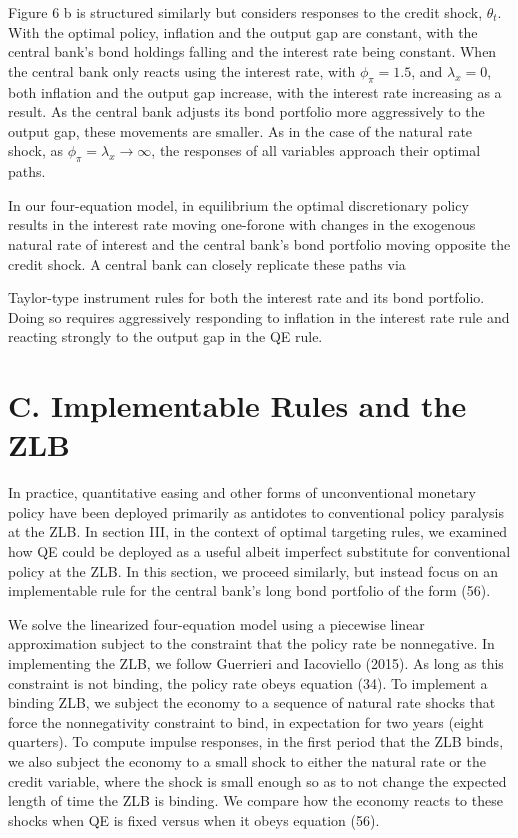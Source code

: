 \documentclass[10pt]{article}
\begin{document}
Figure 6 b is structured similarly but considers responses to the credit shock, $\theta_{t}$. With the optimal policy, inflation and the output gap are constant, with the central bank's bond holdings falling and the interest rate being constant. When the central bank only reacts using the interest rate, with $\phi_{\pi}=1.5$, and $\lambda_{x}=0$, both inflation and the output gap increase, with the interest rate increasing as a result. As the central bank adjusts its bond portfolio more aggressively to the output gap, these movements are smaller. As in the case of the natural rate shock, as $\phi_{\pi}=\lambda_{x} \rightarrow \infty$, the responses of all variables approach their optimal paths.

In our four-equation model, in equilibrium the optimal discretionary policy results in the interest rate moving one-forone with changes in the exogenous natural rate of interest and the central bank's bond portfolio moving opposite the credit shock. A central bank can closely replicate these paths via

Taylor-type instrument rules for both the interest rate and its bond portfolio. Doing so requires aggressively responding to inflation in the interest rate rule and reacting strongly to the output gap in the QE rule.

\section*{C. Implementable Rules and the ZLB}
In practice, quantitative easing and other forms of unconventional monetary policy have been deployed primarily as antidotes to conventional policy paralysis at the ZLB. In section III, in the context of optimal targeting rules, we examined how QE could be deployed as a useful albeit imperfect substitute for conventional policy at the ZLB. In this section, we proceed similarly, but instead focus on an implementable rule for the central bank's long bond portfolio of the form (56).

We solve the linearized four-equation model using a piecewise linear approximation subject to the constraint that the policy rate be nonnegative. In implementing the ZLB, we follow Guerrieri and Iacoviello (2015). As long as this constraint is not binding, the policy rate obeys equation (34). To implement a binding ZLB, we subject the economy to a sequence of natural rate shocks that force the nonnegativity constraint to bind, in expectation for two years (eight quarters). To compute impulse responses, in the first period that the ZLB binds, we also subject the economy to a small shock to either the natural rate or the credit variable, where the shock is small enough so as to not change the expected length of time the ZLB is binding. We compare how the economy reacts to these shocks when QE is fixed versus when it obeys equation (56).
\end{document}
